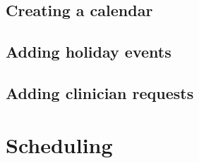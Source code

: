 \documentclass[letterpaper,10pt,english]{sphinxmanual}
\begin{document}
\subsection{Creating a calendar}
\label{\detokenize{index:creating-a-calendar}}

\subsection{Adding holiday events}
\label{\detokenize{index:adding-holiday-events}}

\subsection{Adding clinician requests}
\label{\detokenize{index:adding-clinician-requests}}\label{\detokenize{index:id3}}

\section{Scheduling}
\label{\detokenize{index:scheduling}}
\end{document}
